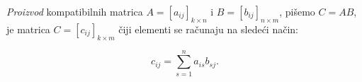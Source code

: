 \documentclass[11pt]{article}
\begin{document}
	\noindent
	\emph{Proizvod} kompatibilnih matrica $ A = [a_{ij}]_{k \times n} $ i $ B = [b_{ij}]_{n \times m} $, pi\v semo $ C = AB $, je matrica $ C = [c_{ij}]_{k \times m} $ \v ciji elementi se ra\v cunaju na slede\' ci na\v cin:

	\begin{equation*}
		c_{ij} = \sum^n_{s = 1} a_{is} b_{sj}.
	\end{equation*}
\end{document}
